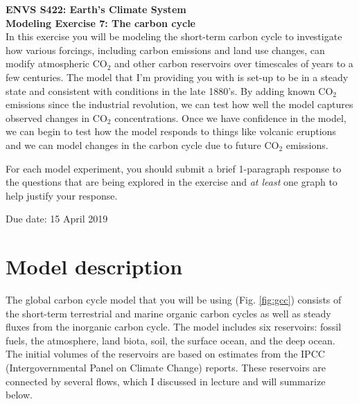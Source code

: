 \documentclass[11pt,letterpaper]{article}
\begin{document}
\setlength{\parindent}{0in}
\newcommand{\tablespace}[0]{\vspace{8pt}}
\textbf{ENVS S422: Earth's Climate System\\
Modeling Exercise 7: The carbon cycle}\\%

In this exercise you will be modeling the short-term carbon cycle to investigate how various forcings, including carbon emissions and land use changes, can modify atmospheric CO$_2$ and other carbon reservoirs over timescales of years to a few centuries. The model that I'm providing you with is set-up to be in a steady state and consistent with conditions in the late 1880's. By adding known CO$_2$ emissions since the industrial revolution, we can test how well the model captures observed changes in CO$_2$ concentrations. Once we have confidence in the model, we can begin to test how the model responds to things like volcanic eruptions and we can model changes in the carbon cycle due to future CO$_2$ emissions.

For each model experiment, you should submit a brief 1-paragraph response to the questions that are being explored in the exercise and \textit{at least} one graph to help justify your response.

Due date: 15 April 2019


\section{Model description}
The global carbon cycle model that you will be using (Fig. \ref{fig:gcc})  consists of the short-term terrestrial and marine organic carbon cycles as well as steady fluxes from the inorganic carbon cycle. The model includes six reservoirs: fossil fuels, the atmosphere, land biota, soil, the surface ocean, and the deep ocean. The initial volumes of the reservoirs are based on estimates from the IPCC (Intergovernmental Panel on Climate Change) reports. These reservoirs are connected by several flows, which I discussed in lecture and will summarize below.
\end{document}
